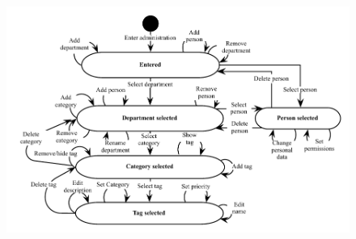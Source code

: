 \begin{figure}[htbp]
\begin{center}
 \includegraphics[scale=0.8]{input/application_domain_analysis/admin_use_case}
\label{fig:use_case_diagram}
\end{center}
\end{figure}